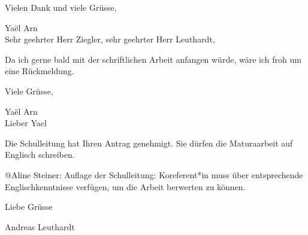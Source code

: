 Vielen Dank und viele Grüsse,

Yaël Arn \\


\noindent Sehr geehrter Herr Ziegler, sehr geehrter Herr Leuthardt,

Da ich gerne bald mit der schriftlichen Arbeit anfangen würde, wäre ich
froh um eine Rückmeldung.

Viele Grüsse,

Yaël Arn \\


\noindent Lieber Yael

Die Schulleitung hat Ihren Antrag genehmigt. Sie dürfen die Maturaarbeit
auf Englisch schreiben.

@Aline Steiner: Auflage der Schulleitung: Koreferent*in muss über
entsprechende Englischkenntnisse verfügen, um die Arbeit berwerten zu
können.

Liebe Grüsse

Andreas Leuthardt

